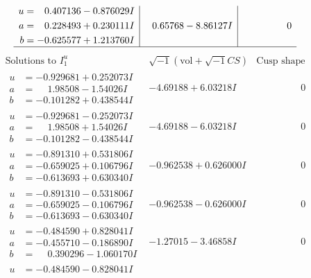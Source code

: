 \documentclass[1p]{elsarticle_modified}
\theoremstyle{definition}
\newcommand{\I}{\sqrt{-1}}
\begin{document}
$$\begin{array}{c|c|c}
\begin{aligned}
u &= \phantom{-}0.407136 - 0.876029 I \\
a &= \phantom{-}0.228493 + 0.230111 I \\
b &= -0.625577 + 1.213760 I\end{aligned}
 & \phantom{-}0.65768 - 8.86127 I & \phantom{-0.000000 } 0\\
 \hline 
 \end{array}$$\newpage$$\begin{array}{c|c|c}  
\text{Solutions to }I^u_{1}& \I (\text{vol} + \sqrt{-1}CS) & \text{Cusp shape}\\
 \hline 
\begin{aligned}
u &= -0.929681 + 0.252073 I \\
a &= \phantom{-}1.98508 - 1.54026 I \\
b &= -0.101282 + 0.438544 I\end{aligned}
 & -4.69188 + 6.03218 I & \phantom{-0.000000 } 0 \\ \hline\begin{aligned}
u &= -0.929681 - 0.252073 I \\
a &= \phantom{-}1.98508 + 1.54026 I \\
b &= -0.101282 - 0.438544 I\end{aligned}
 & -4.69188 - 6.03218 I & \phantom{-0.000000 } 0 \\ \hline\begin{aligned}
u &= -0.891310 + 0.531806 I \\
a &= -0.659025 + 0.106796 I \\
b &= -0.613693 + 0.630340 I\end{aligned}
 & -0.962538 + 0.626000 I & \phantom{-0.000000 } 0 \\ \hline\begin{aligned}
u &= -0.891310 - 0.531806 I \\
a &= -0.659025 - 0.106796 I \\
b &= -0.613693 - 0.630340 I\end{aligned}
 & -0.962538 - 0.626000 I & \phantom{-0.000000 } 0 \\ \hline\begin{aligned}
u &= -0.484590 + 0.828041 I \\
a &= -0.455710 - 0.186890 I \\
b &= \phantom{-}0.390296 - 1.060170 I\end{aligned}
 & -1.27015 - 3.46858 I & \phantom{-0.000000 } 0 \\ \hline\begin{aligned}
u &= -0.484590 - 0.828041 I \\

\end{aligned}
\end{array}$$
\end{document}
